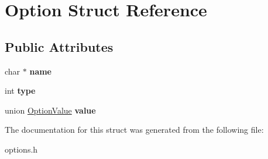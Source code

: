 \hypertarget{structOption}{
\section{Option Struct Reference}
\label{structOption}
}
\subsection*{Public Attributes}
\begin{DoxyCompactItemize}
\item 
\hypertarget{structOption_a8aae24492e599aeb657d5f953044196c}{
char $\ast$ {\bfseries name}}
\label{structOption_a8aae24492e599aeb657d5f953044196c}

\item 
\hypertarget{structOption_a6cfb977fc319239971836988f5f665dc}{
int {\bfseries type}}
\label{structOption_a6cfb977fc319239971836988f5f665dc}

\item 
\hypertarget{structOption_ac5691f09bc79d4185da7d88730f53b62}{
union \hyperlink{unionOptionValue}{OptionValue} {\bfseries value}}
\label{structOption_ac5691f09bc79d4185da7d88730f53b62}

\end{DoxyCompactItemize}


The documentation for this struct was generated from the following file:\begin{DoxyCompactItemize}
\item 
options.h\end{DoxyCompactItemize}
